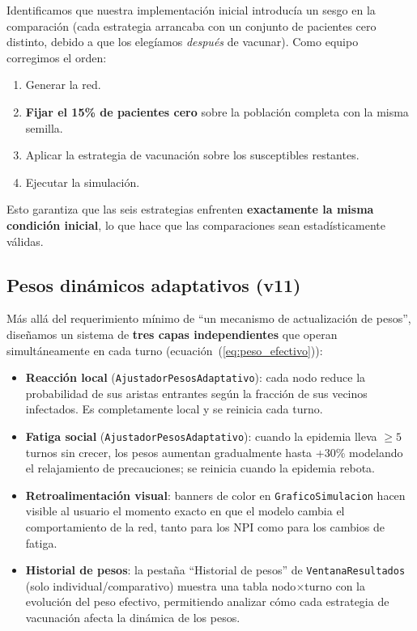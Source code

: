 \documentclass[spanish,notitlepage,letterpaper, 12pt]{article}
\begin{document}
Identificamos que nuestra implementaci\'on inicial introduc\'ia un sesgo en la comparaci\'on (cada estrategia arrancaba con un conjunto de pacientes cero distinto, debido a que los eleg\'iamos \emph{despu\'es} de vacunar). Como equipo corregimos el orden:
\begin{enumerate}
    \item Generar la red.
    \item \textbf{Fijar el 15\% de pacientes cero} sobre la poblaci\'on completa con la misma semilla.
    \item Aplicar la estrategia de vacunaci\'on sobre los susceptibles restantes.
    \item Ejecutar la simulaci\'on.
\end{enumerate}
Esto garantiza que las seis estrategias enfrenten \textbf{exactamente la misma condici\'on inicial}, lo que hace que las comparaciones sean estad\'isticamente v\'alidas.

\subsection{Pesos din\'amicos adaptativos (v11)}

M\'as all\'a del requerimiento m\'inimo de ``un mecanismo de actualizaci\'on de pesos'', dise\~namos un sistema de \textbf{tres capas independientes} que operan simult\'aneamente en cada turno (ecuaci\'on~(\ref{eq:peso_efectivo})):

\begin{itemize}[leftmargin=*]
    \item \textbf{Reacci\'on local} (\texttt{AjustadorPesosAdaptativo}): cada nodo reduce la probabilidad de sus aristas entrantes seg\'un la fracci\'on de sus vecinos infectados. Es completamente local y se reinicia cada turno.
    \item \textbf{Fatiga social} (\texttt{AjustadorPesosAdaptativo}): cuando la epidemia lleva $\geq 5$ turnos sin crecer, los pesos aumentan gradualmente hasta +30\% modelando el relajamiento de precauciones; se reinicia cuando la epidemia rebota.
    \item \textbf{Retroalimentaci\'on visual}: banners de color en \texttt{GraficoSimulacion} hacen visible al usuario el momento exacto en que el modelo cambia el comportamiento de la red, tanto para los NPI como para los cambios de fatiga.
    \item \textbf{Historial de pesos}: la pesta\~na ``Historial de pesos'' de \texttt{VentanaResultados} (solo individual/comparativo) muestra una tabla nodo$\times$turno con la evoluci\'on del peso efectivo, permitiendo analizar c\'omo cada estrategia de vacunaci\'on afecta la din\'amica de los pesos.
\end{itemize}
\end{document}
